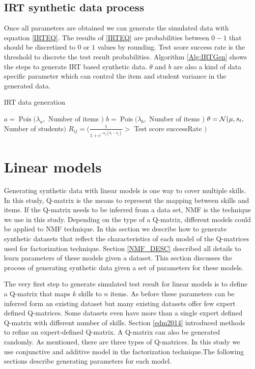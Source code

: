 \subsection{IRT synthetic data process}

Once all parameters are obtained we can generate the simulated data with equation \ref{IRTEQ}. The results of \ref{IRTEQ} are probabilities between $0-1$ that should be discretized to $0$ or $1$ values by rounding. Test score success rate is the threshold to discrete the test result probabilities. Algorithm \ref{Alg:IRTGen} shows the steps to generate IRT based synthetic data. $\theta$ and $b$ are also a kind of data specific parameter which can control the item and student variance in the generated data.

\begin{algorithm}
\caption{IRT data generation}
\label{CHalgorithm}
\begin{algorithmic}[1]
\State $a = \operatorname{Pois} ({\lambda_a},$ Number of items $)$
\State $b = \operatorname{Pois} ({\lambda_b},$ Number of items $)$
\State $\theta = \mathcal{N}(\mu, s_t ,$ Number of students$)$
\State $R_{ij} = (\frac{1}{1+e^{-a_j(\theta_i-b_j)}} >$ Test score successRate $)$
\EndFor
\EndFor
\end{algorithmic}
\label{Alg:IRTGen}
\end{algorithm}



\section{Linear models}
\label{LinearModelSynthetic}
Generating synthetic data with linear models is one way to cover multiple skills. In this study, Q-matrix is the means to represent the mapping between skills and items. If the Q-matrix needs to be inferred from a data set, NMF is the technique we use in this study. Depending on the type of a Q-matrix, different models could be applied to NMF technique. In this section we describe how to generate synthetic datasets that reflect the characteristics of each model of the Q-matrices used for factorization technique. Section \ref{NMF_DESC} described all details to learn parameters of these models given a dataset. This section discusses the process of generating synthetic data given a set of parameters for these models.

The very first step to generate simulated test result for linear models is to define a Q-matrix that maps $k$ skills to $n$ items. As before these parameters can be inferred form an existing dataset but many existing datasets offer few expert defined Q-matrices. Some datasets even have more than a single expert defined Q-matrix with different number of skills. Section \ref{edm2014} introduced methods to refine an expert-defined Q-matrix. A Q-matrix can also be generated randomly. As mentioned, there are three types of Q-matrices. In this study we use conjunctive and additive model in the factorization technique.The following sections describe generating parameters for each model.

